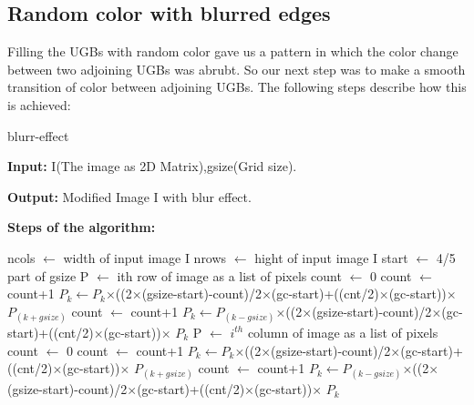 \documentclass[12pt]{article}
\begin{document}
\subsection{Random color with blurred edges}
Filling the UGBs with random color gave us a pattern in which the color change between two adjoining UGBs was abrubt. So our next step was to make a smooth transition of color between adjoining UGBs. The following steps describe how this is achieved:
\begin{algorithm}[htp]
\caption{blurr-effect}
\textbf{Input:} I(The image as 2D Matrix),gsize(Grid size).\par 
\textbf{Output:} Modified Image I with blur effect.\par
\textbf{Steps of the algorithm:}
\begin{algorithmic}[1]
\State ncols $\longleftarrow$ width of input image I
\State nrows $\longleftarrow$ hight of input image I
\State start $\longleftarrow$ 4/5 part of gsize
	\State P $\longleftarrow$ ith row of image as a list of pixels
		\State count $\longleftarrow$ 0
			\State count $\longleftarrow$ count+1
			\State $P_k$$\longleftarrow$$P_k$$\times$((2$\times$(gsize-start)-count)/2$\times$(gc-start)+((cnt/2)$\times$(gc-start))$\times$ $P_{(k+gsize)}$
		\EndFor
			\State count $\longleftarrow$ count+1
			\State $P_{k}$$\longleftarrow$$P_{(k-gsize)}$$\times$((2$\times$(gsize-start)-count)/2$\times$(gc-start)+((cnt/2)$\times$(gc-start))$\times$ $P_{k}$
		\EndFor
   \EndIf
\EndFor
{}
	\State P $\longleftarrow$ $i^{th}$ column of image as a list of pixels
		\State count $\longleftarrow$ 0
			\State count $\longleftarrow$ count+1
			\State $P_k$$\longleftarrow$$P_k$$\times$((2$\times$(gsize-start)-count)/2$\times$(gc-start)+((cnt/2)$\times$(gc-start))$\times$ $P_{(k+gsize)}$
		\EndFor
			\State count $\longleftarrow$ count+1
			\State $P_{k}$$\longleftarrow$$P_{(k-gsize)}$$\times$((2$\times$(gsize-start)-count)/2$\times$(gc-start)+((cnt/2)$\times$(gc-start))$\times$ $P_{k}$
		\EndFor
   \EndIf
\EndFor
\end{algorithmic}
\label{Algorithm:2}
\end{algorithm}
\end{document}
